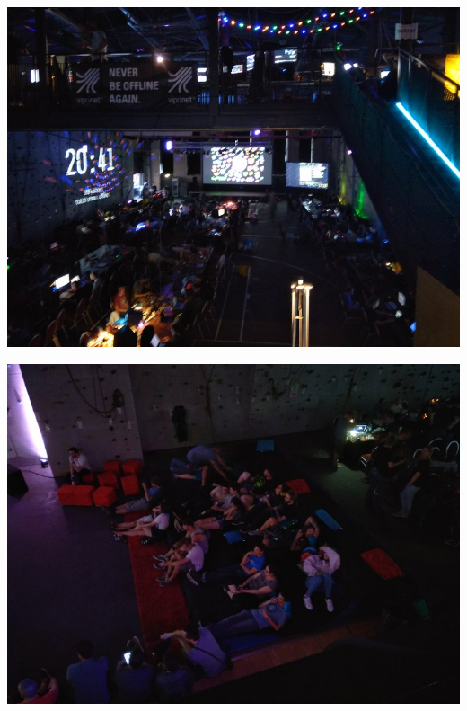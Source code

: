 \documentclass{beamer}
\begin{document}
\begin{frame}
  \includegraphics[width=\textwidth]{IMG_20180817_204114}
\end{frame}

\begin{frame}
  \includegraphics[width=\textwidth]{IMG_20180817_204137}
\end{frame}
\end{document}
